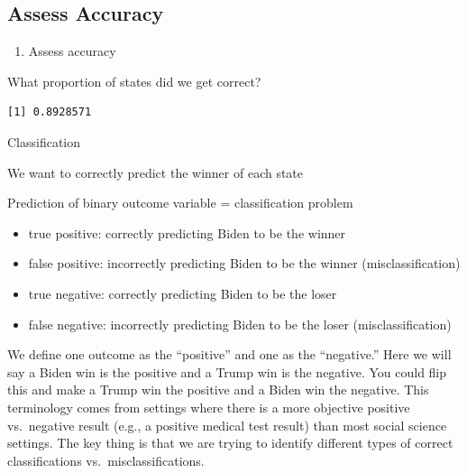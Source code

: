 \documentclass[
  letterpaper,
  DIV=11,
  numbers=noendperiod]{scrreprt}
\newenvironment{Shaded}{\begin{snugshade}}{\end{snugshade}}
\newcommand{\FunctionTok}[1]{\textcolor[rgb]{0.28,0.35,0.67}{#1}}
\newcommand{\NormalTok}[1]{\textcolor[rgb]{0.00,0.23,0.31}{#1}}
\newcommand{\SpecialCharTok}[1]{\textcolor[rgb]{0.37,0.37,0.37}{#1}}
\providecommand{\tightlist}{%
  \setlength{\itemsep}{0pt}\setlength{\parskip}{0pt}}\usepackage{longtable,booktabs,array}
\begin{document}
\hypertarget{assess-accuracy}{%
\subsection{Assess Accuracy}\label{assess-accuracy}}

\begin{enumerate}
\def\labelenumi{\arabic{enumi})}
\setcounter{enumi}{1}
\tightlist
\item
  Assess accuracy
\end{enumerate}

What proportion of states did we get correct?

\begin{Shaded}
\end{Shaded}

\begin{verbatim}
[1] 0.8928571
\end{verbatim}

Classification

We want to correctly predict the winner of each state

Prediction of binary outcome variable = classification problem

\begin{itemize}
\tightlist
\item
  true positive: correctly predicting Biden to be the winner
\item
  false positive: incorrectly predicting Biden to be the winner
  (misclassification)
\item
  true negative: correctly predicting Biden to be the loser
\item
  false negative: incorrectly predicting Biden to be the loser
  (misclassification)
\end{itemize}

We define one outcome as the ``positive'' and one as the ``negative.''
Here we will say a Biden win is the positive and a Trump win is the
negative. You could flip this and make a Trump win the positive and a
Biden win the negative. This terminology comes from settings where there
is a more objective positive vs.~negative result (e.g., a positive
medical test result) than most social science settings. The key thing is
that we are trying to identify different types of correct
classifications vs.~misclassifications.
\end{document}
